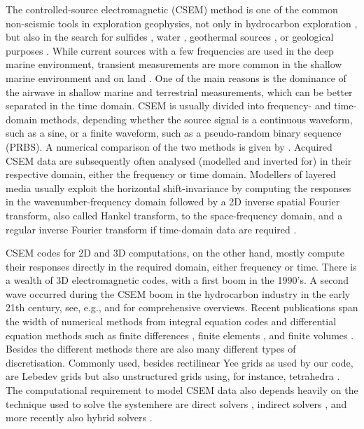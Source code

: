 \documentclass[extra, camera,%
    final,       %
]{gji}
\begin{document}
The controlled-source electromagnetic (CSEM) method is one of the common
non-seismic tools in exploration geophysics, not only in hydrocarbon
exploration \citep{GEO.10.Constable}, but also in the search for sulfides
\citep{GRL.19.Gehrmann}, water \citep{GEO.05.Pedersen}, geothermal sources
\citep{WGC.15.Girard}, or  geological purposes
\citep{NAT.19.Johanson}. While current sources with a few frequencies are used
in the deep marine environment, transient measurements are more common in the
shallow marine environment and on land \citep[e.g., ][]{GEO.07.Ziolkowski,
SEG.07.Andreis, SEG.07.Avdeeva}. One of the main reasons is the dominance of
the airwave in shallow marine and terrestrial measurements, which can be better
separated in the time domain. CSEM is usually divided into frequency- and
time-domain methods, depending  whether the source signal is a
continuous waveform, such as a sine, or a finite waveform, such as a
pseudo-random binary sequence (PRBS). A numerical comparison of the two methods
is given by \cite{GP.13.Conell}. Acquired CSEM data are subsequently often
analysed (modelled and inverted for) in their respective domain, either the
frequency or time domain. Modellers of layered media usually exploit the
horizontal shift-invariance by computing the responses in the
wavenumber-frequency domain followed by a 2D inverse spatial Fourier transform,
also called Hankel transform, to the space-frequency domain, and a regular
inverse Fourier transform if time-domain data are required \citep[e.g.,
][]{GEO.15.Hunziker}.

CSEM codes for 2D and 3D computations, on the other hand, mostly compute their
responses directly in the required domain, either frequency or time. There is a
wealth of 3D electromagnetic codes, with a first boom in the 1990's. A second wave occurred during the CSEM boom
in the hydrocarbon industry in the early 21th century, see, e.g.,
\cite{SG.05.Avdeev} and \cite{SG.10.Borner} for comprehensive overviews. Recent
publications  span the width of numerical
methods from integral equation codes \citep{MGS.17.Kruglyakov} and differential
equation methods such as finite differences
{\mbox{\citep{CAG.13.Sommer}}}, finite elements \citep{GJI.13.Grayver}, and
finite volumes \citep{GEO.14.Jahandari}. Besides the different methods there
are also many different types of discretisation. Commonly used, besides
rectilinear Yee grids \citep{IEEE.66.Yee} as used by our code, are Lebedev
grids \citep{CMMP.64.Lebedev} but also unstructured grids using, for instance,
tetrahedra \citep{CAG.17.Cai}. The computational requirement to
model CSEM data also depends heavily on the technique  used
to solve the systemhere are direct solvers
\citep{GEO.15.Grayver}, indirect solvers \citep{GJI.15.Jaysaval}, and more
recently also hybrid solvers \citep{GEO.18.Liu}.
\end{document}
